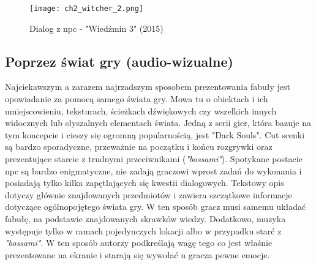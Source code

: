 \begin{figure}[h]
    \texttt{[image: ch2\_witcher\_2.png]}
    \caption{Dialog z \gls{npc} - "Wiedźmin 3" (2015)}
    \centering
    \label{fig:ch1_2_2_dialogue}
\end{figure}

\subsection{Poprzez świat gry (audio-wizualne)}

Najciekawszym a zarazem najrzadszym\cite{the_evolution_of_video_games} sposobem prezentowania fabuły
jest opowiadanie za pomocą samego świata gry. Mowa tu o obiektach i ich umiejscowieniu, teksturach,
ścieżkach dźwiękowych czy wszelkich innych widocznych lub słyszalnych elementach świata. Jedną z
serii gier, która bazuje na tym koncepcie i cieszy się ogromną popularnością, jest "Dark Souls".
Cut scenki są bardzo sporadyczne, przeważnie na początku i końcu rozgrywki oraz prezentujące starcie
z trudnymi przeciwnikami (\textit{"bossami"}). Spotykane postacie \gls{npc} są bardzo enigmatyczne, nie
zadają graczowi wprost zadań do wykonania i posiadają tylko kilka zapętlających się kwestii
dialogowych. Tekstowy opis dotyczy głównie znajdowanych przedmiotów i zawiera szczątkowe informacje
dotyczące ogólnopojętego świata gry. W ten sposób gracz musi samemu układać fabułę, na podstawie
znajdowanych skrawków wiedzy. Dodatkowo, muzyka występuje tylko w ramach pojedynczych lokacji albo
w przypadku starć z \textit{"bossami"}. W ten sposób autorzy podkreślają wagę tego co jest właśnie
prezentowane na ekranie i starają się wywołać u gracza pewne emocje.